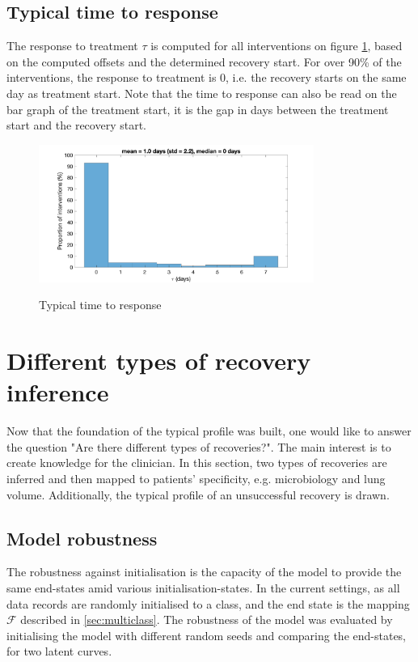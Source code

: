 \subsection{Typical time to response}
The response to treatment $\tau$ is computed for all interventions on figure \ref{fig:tau}, based on the computed offsets and the determined recovery start. For over 90\% of the interventions, the response to treatment is 0, i.e. the recovery starts on the same day as treatment start. Note that the time to response can also be read on the bar graph of the treatment start, it is the gap in days between the treatment start and the recovery start.

\begin{figure}[!h]
    \caption{Typical time to response}
    \centering
    \includegraphics[width=90mm]{images/tautypical.png}
    \label{fig:tau}
\end{figure}

\section{Different types of recovery inference}
Now that the foundation of the typical profile was built, one would like to answer the question "Are there different types of recoveries?". The main interest is to create knowledge for the clinician. In this section, two types of recoveries are inferred and then mapped to patients' specificity, e.g. microbiology and lung volume. Additionally, the typical profile of an unsuccessful recovery is drawn.

\subsection{Model robustness}
The robustness against initialisation is the capacity of the model to provide the same end-states amid various initialisation-states. In the current settings, as all data records are randomly initialised to a class, and the end state is the mapping $\mathcal{F}$ described in \ref{sec:multiclass}. The robustness of the model was evaluated by initialising the model with different random seeds and comparing the end-states, for two latent curves.


